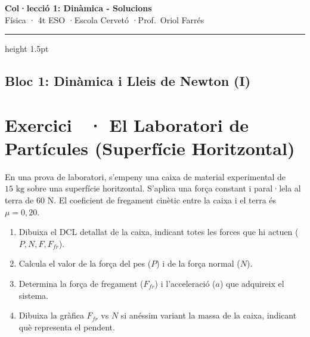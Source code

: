 \documentclass[12pt,a4paper,twoside]{article}
\newcounter{exercici}
\newcommand{\exercici}[1]{%
  \stepcounter{exercici}
  \section*{Exercici \theexercici\ \textnormal{· #1}}
  \vspace{-10pt}
}
\begin{document}
\begin{center}
  \vspace*{-15pt}
  {\Huge\bfseries Col·lecció 1: Dinàmica - Solucions}\\[8pt]
  {\Large Física · 4t ESO \quad·\quad Escola Cervetó \quad·\quad Prof.\ Oriol Farrés}\\[12pt]
  \hrule height 1.5pt
  \vspace{5pt}
\end{center}

\vspace{0.3cm}

\subsection*{Bloc 1: Dinàmica i Lleis de Newton (I)}

\exercici{El Laboratori de Partícules (Superfície Horitzontal)}
En una prova de laboratori, s'empeny una caixa de material experimental de $15 \text{ kg}$ sobre una superfície horitzontal. S'aplica una força constant i paral·lela al terra de $60 \text{ N}$. El coeficient de fregament cinètic entre la caixa i el terra és $\mu = 0{,}20$.
\begin{enumerate}[label=\textbf{\alph*)}]
  \item Dibuixa el DCL detallat de la caixa, indicant totes les forces que hi actuen ($P, N, F, F_{fr}$).
  \item Calcula el valor de la força del pes ($P$) i de la força normal ($N$).
  \item Determina la força de fregament ($F_{fr}$) i l'acceleració ($a$) que adquireix el sistema.
  \item Dibuixa la gràfica $F_{fr}$ vs $N$ si anéssim variant la massa de la caixa, indicant què representa el pendent.
\end{enumerate}
\end{document}
